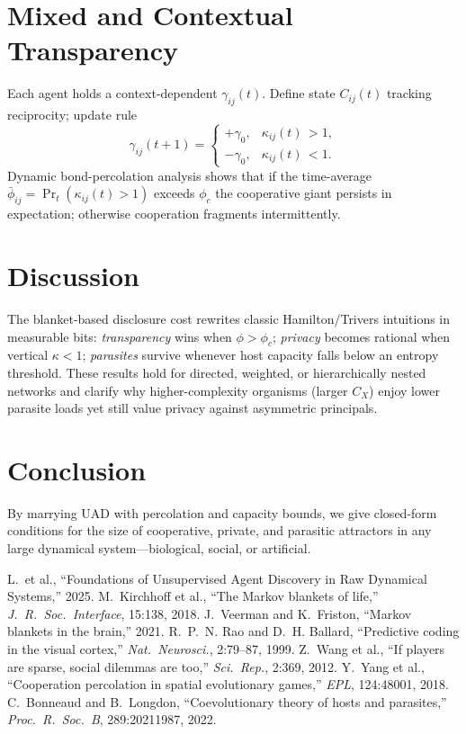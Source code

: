 \documentclass[10pt,conference]{IEEEtran}
\begin{document}
\section{Mixed and Contextual Transparency}

Each agent holds a context-dependent \(\gamma_{ij}(t)\).  
Define state \(C_{ij}(t)\) tracking reciprocity; update rule
\[
\gamma_{ij}(t+1)=
\begin{cases}
+\gamma_0,&\kappa_{ij}(t)\,{>}1,\\
-\gamma_0,&\kappa_{ij}(t)\,{<}1.
\end{cases}
\]
Dynamic bond-percolation analysis shows that if the time-average
\(\bar\phi_{ij}=\Pr_t(\kappa_{ij}(t)>1)\) exceeds \(\phi_c\) the cooperative giant persists in expectation; otherwise cooperation fragments intermittently.

\section{Discussion}

The blanket-based disclosure cost rewrites classic Hamilton/Trivers intuitions in measurable bits:
\emph{transparency} wins when \(\phi>\phi_c\); \emph{privacy} becomes rational when vertical \(\kappa<1\); \emph{parasites} survive whenever host capacity falls below an entropy threshold.  
These results hold for directed, weighted, or hierarchically nested networks and clarify why higher-complexity organisms (larger \(C_X\)) enjoy lower parasite loads yet still value privacy against asymmetric principals.

\section{Conclusion}

By marrying UAD with percolation and capacity bounds, we give closed-form conditions for the size of cooperative, private, and parasitic attractors in any large dynamical system—biological, social, or artificial.


\begin{thebibliography}{10}
 L.\ et al., “Foundations of Unsupervised Agent Discovery in Raw Dynamical Systems,” 2025.
 M.~Kirchhoff et al., “The Markov blankets of life,” \emph{J.\ R.\ Soc.\ Interface}, 15:138, 2018.
 J.~Veerman and K.~Friston, “Markov blankets in the brain,” 2021.
 R.~P.~N. Rao and D.~H. Ballard, “Predictive coding in the visual cortex,” \emph{Nat.\ Neurosci.}, 2:79–87, 1999.
 Z.~Wang et al., “If players are sparse, social dilemmas are too,” \emph{Sci.\ Rep.}, 2:369, 2012.
 Y.~Yang et al., “Cooperation percolation in spatial evolutionary games,” \emph{EPL}, 124:48001, 2018.
 C.~Bonneaud and B.~Longdon, “Coevolutionary theory of hosts and parasites,” \emph{Proc.\ R.\ Soc.\ B}, 289:20211987, 2022.
\end{thebibliography}
\end{document}
